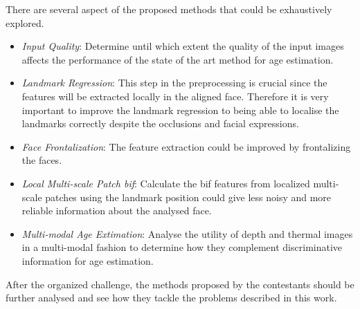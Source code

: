 There are several aspect of the proposed methods that could be exhaustively explored.

\begin{itemize}
	\item \textit{Input Quality}: Determine until which extent the quality of the input images affects the performance of the state of the art method for age estimation.
	
	\item \textit{Landmark Regression}: This step in the preprocessing is crucial since the features will be extracted locally in the aligned face. Therefore it is very important to improve the landmark regression to being able to localise the landmarks correctly despite the occlusions and facial expressions.
	
	\item \textit{Face Frontalization}: The feature extraction could be improved by frontalizing the faces.
	
	\item \textit{Local Multi-scale Patch \gls{bif}}: Calculate the \gls{bif} features from localized multi-scale patches using the landmark position could give less noisy and more reliable information about the analysed face.
	
	\item \textit{Multi-modal Age Extimation}: Analyse the utility of depth and thermal images in a multi-modal fashion to determine how they complement discriminative information for age estimation.
\end{itemize}

After the organized challenge, the methods proposed by the contestants should be further analysed and see how they tackle the problems described in this work.


